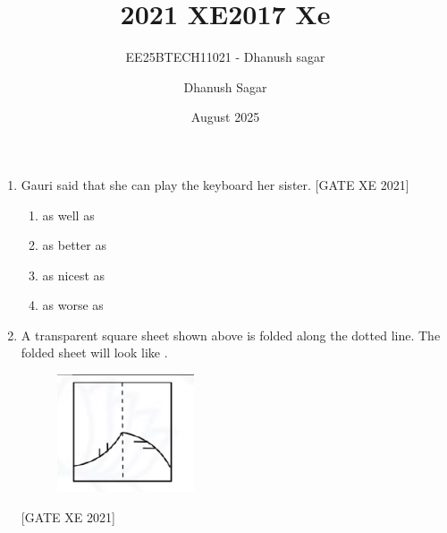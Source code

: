 \documentclass[journal,12pt,onecolumn]{IEEEtran}
\theoremstyle{remark}
\begin{document}
\title{2021 XE}
\author{EE25BTECH11021 - Dhanush sagar}
\maketitle
\renewcommand{\thefigure}{\theenumi}
\renewcommand{\thetable}{\theenumi}
\title{2017 Xe}
\author{Dhanush Sagar}
\date{August 2025}



\begin{enumerate}

  \item Gauri said that she can play the keyboard \underline{\hspace{2cm}} her sister. \hfill[GATE XE 2021]

  \begin{multicols}{2}
  \begin{enumerate}
    \item as well as
    \item as better as
    \item as nicest as
    \item as worse as
  \end{enumerate}
  \end{multicols}

  \item A transparent square sheet shown above is folded along the dotted line. The folded sheet will look like \underline{\hspace{1.5cm}}. 
  \begin{figure}[H]
      \centering
      \includegraphics[width=0.3\columnwidth]{figs/fig1.png}
      \caption{}
      \label{fig:placeholder}
  \end{figure}
  
  \hfill[GATE XE 2021]


\end{enumerate}
\end{document}
